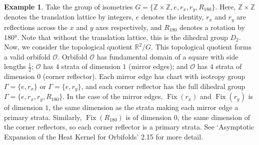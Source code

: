 \documentclass{article}[12pt]
\theoremstyle{definition}
\newtheorem*{example}{Example}
\newcommand{\orb}{\mathcal{O}}
\DeclareMathOperator{\fix}{Fix}
\begin{document}
\begin{example}
    Take the group of isometries $G = \{\mathbb{Z} \times \mathbb{Z}, e,
    r_x,  r_y, R_{180}\}$. Here, $\mathbb{Z} \times \mathbb{Z}$ denotes the
    translation lattice by integers, $e$ denotes the identity, $r_x$ and
    $r_y$ are reflections across the $x$ and $y$ axes respectively, and
    $R_{180}$ denotes a rotation by $\ang{180}$. Note that without the
    translation lattice, this is the dihedral group $D_2$.  Now, we
    consider the topological quotient $\mathbb{R}^2/G$. This topological
    quotient forms a valid orbifold $\orb$. Orbifold $\orb$ has fundamental
    domain of a square with side lengths $\frac{1}{2}$; $\orb$ has $4$
    strata of dimension $1$ (mirror edges); and $\orb$ has $4$ strata of
    dimension $0$ (corner reflector). Each mirror edge has chart with
    isotropy group $\Gamma = \{e,r_x\}$ or $\Gamma = \{e,r_y\}$, and each
    corner reflector has the full dihedral group $\Gamma =
    \{e,r_x,r_y,R_{180}\}$. In the case of the mirror edges, $\fix(r_x)$
    and $\fix(r_y)$ is of dimension $1$, the same dimension as the strata
    making each mirror edge a primary strata. Similarly, $\fix(R_{180})$ is
    of dimension $0$, the same dimension of the corner reflectors, so each
    corner reflector is a primary strata. See `Asymptotic Expansion
    of the Heat Kernel for Orbifolds' 2.15 for more detail\cite{DGGW}.
\end{example}

%

\end{document}
